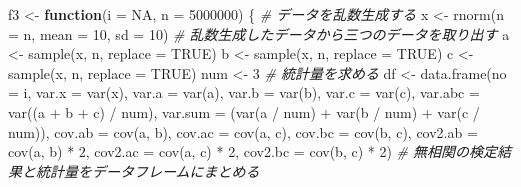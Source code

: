 \documentclass[]{tufte-handout}
\newenvironment{Shaded}{}{}
\newcommand{\AttributeTok}[1]{\textcolor[rgb]{0.49,0.56,0.16}{#1}}
\newcommand{\CommentTok}[1]{\textcolor[rgb]{0.38,0.63,0.69}{\textit{#1}}}
\newcommand{\ConstantTok}[1]{\textcolor[rgb]{0.53,0.00,0.00}{#1}}
\newcommand{\ControlFlowTok}[1]{\textcolor[rgb]{0.00,0.44,0.13}{\textbf{#1}}}
\newcommand{\DecValTok}[1]{\textcolor[rgb]{0.25,0.63,0.44}{#1}}
\newcommand{\FunctionTok}[1]{\textcolor[rgb]{0.02,0.16,0.49}{#1}}
\newcommand{\NormalTok}[1]{#1}
\newcommand{\OtherTok}[1]{\textcolor[rgb]{0.00,0.44,0.13}{#1}}
\newcommand{\SpecialCharTok}[1]{\textcolor[rgb]{0.25,0.44,0.63}{#1}}
\begin{document}
\begin{Shaded}
\begin{Highlighting}[numbers=left,,]
\NormalTok{f3 }\OtherTok{\textless{}{-}} \ControlFlowTok{function}\NormalTok{(}\AttributeTok{i =} \ConstantTok{NA}\NormalTok{, }\AttributeTok{n =} \DecValTok{5000000}\NormalTok{) \{}
  \CommentTok{\# データを乱数生成する}
\NormalTok{  x }\OtherTok{\textless{}{-}} \FunctionTok{rnorm}\NormalTok{(}\AttributeTok{n =}\NormalTok{ n, }\AttributeTok{mean =} \DecValTok{10}\NormalTok{, }\AttributeTok{sd =} \DecValTok{10}\NormalTok{)}
  \CommentTok{\# 乱数生成したデータから三つのデータを取り出す}
\NormalTok{  a }\OtherTok{\textless{}{-}} \FunctionTok{sample}\NormalTok{(x, n, }\AttributeTok{replace =} \ConstantTok{TRUE}\NormalTok{)}
\NormalTok{  b }\OtherTok{\textless{}{-}} \FunctionTok{sample}\NormalTok{(x, n, }\AttributeTok{replace =} \ConstantTok{TRUE}\NormalTok{)}
\NormalTok{  c }\OtherTok{\textless{}{-}} \FunctionTok{sample}\NormalTok{(x, n, }\AttributeTok{replace =} \ConstantTok{TRUE}\NormalTok{)}
\NormalTok{  num }\OtherTok{\textless{}{-}} \DecValTok{3}
  \CommentTok{\# 統計量を求める}
\NormalTok{  df }\OtherTok{\textless{}{-}} \FunctionTok{data.frame}\NormalTok{(}\AttributeTok{no =}\NormalTok{ i,}
                   \AttributeTok{var.x =} \FunctionTok{var}\NormalTok{(x), }
                   \AttributeTok{var.a =} \FunctionTok{var}\NormalTok{(a), }\AttributeTok{var.b =} \FunctionTok{var}\NormalTok{(b), }\AttributeTok{var.c =} \FunctionTok{var}\NormalTok{(c),}
                   \AttributeTok{var.abc =} \FunctionTok{var}\NormalTok{((a }\SpecialCharTok{+}\NormalTok{ b }\SpecialCharTok{+}\NormalTok{ c) }\SpecialCharTok{/}\NormalTok{ num),}
                   \AttributeTok{var.sum =}\NormalTok{ (}\FunctionTok{var}\NormalTok{(a }\SpecialCharTok{/}\NormalTok{ num) }\SpecialCharTok{+} \FunctionTok{var}\NormalTok{(b }\SpecialCharTok{/}\NormalTok{ num) }\SpecialCharTok{+} \FunctionTok{var}\NormalTok{(c }\SpecialCharTok{/}\NormalTok{ num)),}
                   \AttributeTok{cov.ab =} \FunctionTok{cov}\NormalTok{(a, b), }\AttributeTok{cov.ac =} \FunctionTok{cov}\NormalTok{(a, c), }\AttributeTok{cov.bc =} \FunctionTok{cov}\NormalTok{(b, c),}
                   \AttributeTok{cov2.ab =} \FunctionTok{cov}\NormalTok{(a, b) }\SpecialCharTok{*} \DecValTok{2}\NormalTok{, }\AttributeTok{cov2.ac =} \FunctionTok{cov}\NormalTok{(a, c) }\SpecialCharTok{*} \DecValTok{2}\NormalTok{, }\AttributeTok{cov2.bc =} \FunctionTok{cov}\NormalTok{(b, c) }\SpecialCharTok{*} \DecValTok{2}\NormalTok{)}
  \CommentTok{\# 無相関の検定結果と統計量をデータフレームにまとめる}

\end{Highlighting}
\end{Shaded}
\end{document}
